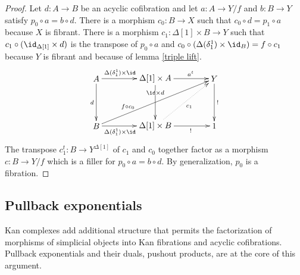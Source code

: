 \documentclass{tac}
\newcommand\bang{!}
\newcommand\of{:}
\newcommand\simplex\Delta
\begin{document}
\begin{proof}
Let $d\of A\to B$ be an acyclic cofibration and let $a\of A\to Y/f$ and $b\of B\to Y$ satisfy $p_0\circ a = b\circ d$. There is a morphism $c_0\of B\to X$ such that $c_0\circ d = p_1\circ a$ because $X$ is fibrant. There is a morphism $c_1\of\simplex[1]\times B\to Y$ such that $c_1\circ{(\id_{\simplex[1]}\times d)}$ is the transpose of $p_0\circ a$ and $c_0\circ (\simplex(\delta^1_1)\times \id_B) = f\circ c_1$ because $Y$ is fibrant and because of lemma \ref{triple lift}.
\[\xy
(0,20)*+{A}="AC",(25,20)*+{\simplex[1]\times A}="BC",(50,20)*+{Y}="Y",
(0,0)*+{B}="AD",(25,0)*+{\simplex[1]\times B}="BD",(50,0)*+{1}="one"
\ar^(.4){\simplex(\delta^1_1)\times\id} "AC";"BC"
\ar_{d} "AC";"AD"
\ar_(.4){\simplex(\delta^1_1)\times\id} "AD";"BD"
\ar^(.3){f\circ c_0} "AD";"Y"
\ar|(.3){\id\times d} "BC";"BD"
\ar^(.6){a^t} "BC";"Y"
\ar@{.>}_{c_1} "BD";"Y"
\ar_(.6){\bang} "BD";"one"
\ar^{\bang} "Y";"one"
\endxy\]
The transpose $c_1^t\of B\to Y^{\simplex[1]}$ of $c_1$ and $c_0$ together factor as a morphism $c\of B \to Y/f$ which is a filler for $p_0\circ a = b\circ d$. By generalization, $p_0$ is a fibration.
\end{proof}


\subsection{Pullback exponentials}
Kan complexes add additional structure that permits the factorization of morphisms of simplicial objects into Kan fibrations and acyclic cofibrations. Pullback exponentials and their duals, pushout products, are at the core of this argument.
\end{document}
